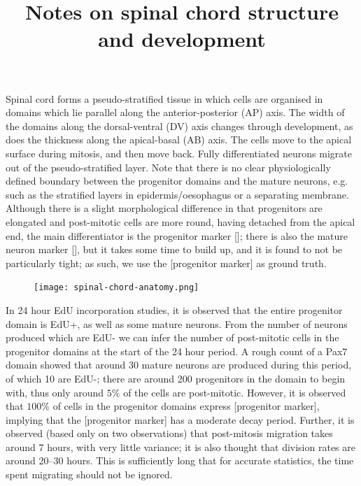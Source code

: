 \documentclass[10pt,english]{article}
\begin{document}
\title{Notes on spinal chord structure and development}

\maketitle

Spinal cord forms a pseudo-stratified tissue in which cells are organised in domains which lie parallel along the anterior-posterior (AP) axis. The width of the domains along the dorsal-ventral (DV) axis changes through development, as does the thickness along the apical-basal (AB) axis. The cells move to the apical surface during mitosis, and then move back. Fully differentiated neurons migrate out of the pseudo-stratified layer. Note that there is no clear physiologically defined boundary between the progenitor domains and the mature neurons, e.g. such as the stratified layers in epidermis/oesophagus or a separating membrane. Although there is a slight morphological difference in that progenitors are elongated and post-mitotic cells are more round, having detached from the apical end, the main differentiator is the progenitor marker []; there is also the mature neuron marker [], but it takes some time to build up, and it is found to not be particularly tight; as such, we use the [progenitor marker] as ground truth.

\begin{figure}[h]
	\begin{center}
		\texttt{[image: spinal-chord-anatomy.png]}
	\end{center}
	\label{fig:anatomy}
\end{figure}

In 24 hour EdU incorporation studies, it is observed that the entire progenitor domain is EdU+, as well as some mature neurons. From the number of neurons produced which are EdU- we can infer the number of post-mitotic cells in the progenitor domains at the start of the 24 hour period. A rough count of a Pax7 domain showed that around 30 mature neurons are produced during this period, of which 10 are EdU-; there are around 200 progenitors in the domain to begin with, thus only around $5\%$ of the cells are post-mitotic. However, it is observed that $100\%$ of cells in the progenitor domains express [progenitor marker], implying that the [progenitor marker] has a moderate decay period. Further, it is observed (based only on two observations) that post-mitosis migration takes around 7 hours, with very little variance; it is also thought that division rates are around 20--30 hours. This is sufficiently long that for accurate statistics, the time spent migrating should not be ignored.
\end{document}
